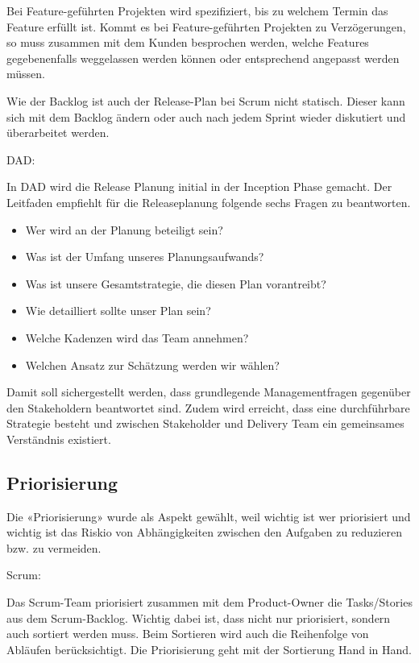 Bei Feature-geführten Projekten wird spezifiziert, bis zu welchem Termin das Feature erfüllt ist. Kommt es bei Feature-geführten Projekten zu Verzögerungen, so muss zusammen mit dem Kunden besprochen werden, welche Features gegebenenfalls weggelassen werden können oder entsprechend angepasst werden müssen.\smallskip

Wie der Backlog ist auch der Release-Plan bei Scrum nicht statisch. Dieser kann sich mit dem Backlog ändern oder auch nach jedem Sprint wieder diskutiert und überarbeitet werden.
\bigskip 

{\Large DAD:} \cite{planningReleaseDad} \medskip

In DAD wird die Release Planung initial in der Inception Phase gemacht. Der Leitfaden empfiehlt für die Releaseplanung folgende sechs Fragen zu beantworten.
\begin{itemize}
	\item Wer wird an der Planung beteiligt sein?
	\item Was ist der Umfang unseres Planungsaufwands?
	\item Was ist unsere Gesamtstrategie, die diesen Plan vorantreibt?
    \item Wie detailliert sollte unser Plan sein?
    \item Welche Kadenzen wird das Team annehmen?
    \item Welchen Ansatz zur Schätzung werden wir wählen?
\end{itemize}
Damit soll sichergestellt werden, dass grundlegende Managementfragen gegenüber den Stakeholdern beantwortet sind. Zudem wird erreicht, dass eine durchführbare Strategie besteht und zwischen Stakeholder und Delivery Team ein gemeinsames Verständnis existiert.


\subsection{Priorisierung}

Die «Priorisierung» wurde als Aspekt gewählt, weil wichtig ist wer priorisiert und wichtig ist das Riskio von Abhängigkeiten zwischen den Aufgaben zu reduzieren bzw. zu vermeiden.

{\Large Scrum:} \cite{planningPrioScrum} \medskip

Das Scrum-Team priorisiert zusammen mit dem Product-Owner die Tasks/Stories aus dem Scrum-Backlog. Wichtig dabei ist, dass nicht nur priorisiert, sondern auch sortiert werden muss. Beim Sortieren wird auch die Reihenfolge von Abläufen berücksichtigt. Die Priorisierung geht mit der Sortierung Hand in Hand. \smallskip

